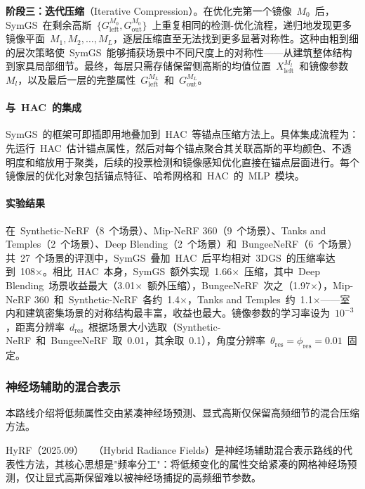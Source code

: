 \textbf{阶段三：迭代压缩}（Iterative Compression）。在优化完第一个镜像~$M_0$~后，SymGS~在剩余高斯~$\{G_{\text{left}}^{M_0}, G_{\text{out}}^{M_0}\}$~上重复相同的检测-优化流程，递归地发现更多镜像平面~$M_1, M_2, \ldots, M_L$，逐层压缩直至无法找到更多显著对称性。这种由粗到细的层次策略使~SymGS~能够捕获场景中不同尺度上的对称性——从建筑整体结构到家具局部细节。最终，每层只需存储保留侧高斯的均值位置~$X_{\text{left}}^{M_l}$~和镜像参数~$M_l$，以及最后一层的完整属性~$G_{\text{left}}^{M_L}$~和~$G_{\text{out}}^{M_L}$。

\paragraph{与~HAC~的集成}

SymGS~的框架可即插即用地叠加到~HAC~等锚点压缩方法上。具体集成流程为：先运行~HAC~估计锚点属性，然后对每个锚点聚合其关联高斯的平均颜色、不透明度和缩放用于聚类，后续的投票检测和镜像感知优化直接在锚点层面进行。每个镜像层的优化对象包括锚点特征、哈希网格和~HAC~的~MLP~模块。

\paragraph{实验结果}

在~Synthetic-NeRF（8~个场景）、Mip-NeRF 360（9~个场景）、Tanks and Temples（2~个场景）、Deep Blending（2~个场景）和~BungeeNeRF（6~个场景）共~27~个场景的评测中，SymGS~叠加~HAC~后平均相对~3DGS~的压缩率达到~108$\times$。相比~HAC~本身，SymGS~额外实现~1.66$\times$~压缩，其中~Deep Blending~场景收益最大（3.01$\times$~额外压缩），BungeeNeRF~次之（1.97$\times$），Mip-NeRF 360~和~Synthetic-NeRF~各约~1.4$\times$，Tanks and Temples~约~1.1$\times$——室内和建筑密集场景的对称结构最丰富，收益也最大。镜像参数的学习率设为~$10^{-3}$，距离分辨率~$d_{\text{res}}$~根据场景大小选取（Synthetic-NeRF~和~BungeeNeRF~取~0.01，其余取~0.1），角度分辨率~$\theta_{\text{res}} = \phi_{\text{res}} = 0.01$~固定。

\subsubsection{神经场辅助的混合表示}

本路线介绍将低频属性交由紧凑神经场预测、显式高斯仅保留高频细节的混合压缩方法。

HyRF（2025.09）~\cite{2509_17083}~（Hybrid Radiance Fields）是神经场辅助混合表示路线的代表性方法，其核心思想是"频率分工"：将低频变化的属性交给紧凑的网格神经场预测，仅让显式高斯保留难以被神经场捕捉的高频细节参数。

